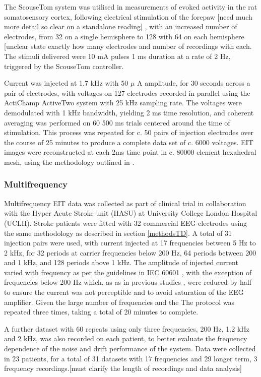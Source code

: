 The ScouseTom system was utilised in measurements of evoked activity in the rat somatosensory cortex, following electrical stimulation of the forepaw [need much more detail so clear on a standalone reading] \cite{Aristovich_2016} \cite{Vongerichten_2016}, with an increased number of electrodes, from 32 on a single hemisphere to 128 with 64 on each hemisphere [unclear state exactly how many electrodes and number of recordings with each. The stimuli delivered were 10 mA pulses 1 ms duration at a rate of 2 Hz, triggered by the ScouseTom controller.

Current was injected at 1.7 kHz with 50 $\mu$ A amplitude, for 30 seconds across a pair of electrodes, with voltages on 127 electrodes recorded in parallel using the ActiChamp ActiveTwo system with 25 kHz sampling rate. The voltages were demodulated with 1 kHz bandwidth, yielding 2 ms time resolution, and coherent averaging was performed on 60 500 ms trials centered around the time of stimulation. This process was repeated for c. 50 pairs of injection electrodes over the course of 25 minutes to produce a complete data set of c. 6000 voltages. EIT images were reconstructed at each 2ms time point in c. 80000 element hexahedral mesh, using the methodology outlined in \cite{Aristovich_2014}.

\subsubsection{Multifrequency}

Multifrequency EIT data was collected as part of clinical trial in collaboration with the Hyper Acute Stroke unit (HASU) at University College London Hospital (UCLH). Stroke patients were fitted with 32 commercial EEG electrodes using the same methodology as described in section \ref{methodsTD}. A total of 31 injection pairs were used, with current injected at 17 frequencies between 5 Hz to 2 kHz, for 32 periods at carrier frequencies below 200 Hz, 64 periods between 200 and 1 kHz, and 128 periods above 1 kHz. The amplitude of injected current varied with frequency as per the guidelines in IEC 60601 \cite{IEC}, with the exception of frequencies below 200 Hz which, as as in previous studies \cite{McEwan_2006}, were reduced by half to ensure the current was not perceptible and to avoid saturation of the EEG amplifier. Given the large number of frequencies and the The protocol was repeated three times, taking a total of 20 minutes to complete. 

A further dataset with 60 repeats using only three frequencies, 200 Hz, 1.2 kHz and 2 kHz, was also recorded on each patient, to better evaluate the frequency dependence of the noise and drift performance of the system. Data were collected in 23 patients, for a total of 31 datasets with 17 frequencies and 29 longer term, 3 frequency recordings.[must clarify the length of recordings and data analysis] 

